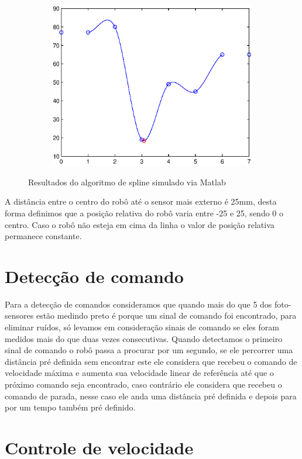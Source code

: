\documentclass{article}
\begin{document}
\begin{figure}[H]
\begin{subfigure}{0.45\textwidth}
		\includegraphics[width=\linewidth]{spline3}
	\end{subfigure}
	\caption{Resultados do algoritmo de spline simulado via Matlab}	
	\label{fig:spline}
\end{figure}


A distância entre o centro do robô até o sensor mais externo é 25mm, desta forma definimos que a posição relativa do robô varia entre -25 e 25, sendo 0 o centro. Caso o robô não esteja em cima da linha o valor de posição relativa permanece constante.

\section{Detecção de comando}

Para a detecção de comandos consideramos que quando mais do que 5 dos foto-sensores estão medindo preto é porque um sinal de comando foi encontrado, para eliminar ruídos, só levamos em consideração sinais de comando se eles foram medidos mais do que duas vezes consecutivas. Quando detectamos o primeiro sinal de comando o robô passa a procurar por um segundo, se ele percorrer uma distância pré definida sem encontrar este ele considera que recebeu o comando de velocidade máxima e aumenta sua velocidade linear de referência até que o próximo comando seja encontrado, caso contrário ele considera que recebeu o comando de parada, nesse caso ele anda uma distância pré definida e depois para por um tempo também pré definido. 

\section{Controle de velocidade}
\end{document}
